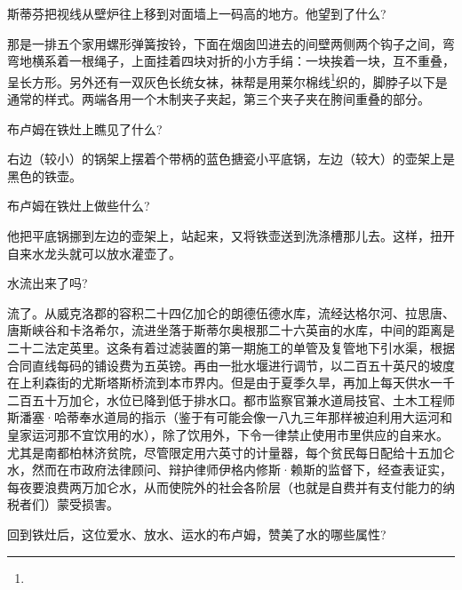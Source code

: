 \par 斯蒂芬把视线从壁炉往上移到对面墙上一码高的地方。他望到了什么?
\par 那是一排五个家用螺形弹簧按铃，下面在烟囱凹进去的间壁两侧两个钩子之间，弯弯地横系着一根绳子，上面挂着四块对折的小方手绢：一块挨着一块，互不重叠，呈长方形。另外还有一双灰色长统女袜，袜帮是用莱尔棉线\footnote{}织的，脚脖子以下是通常的样式。两端各用一个木制夹子夹起，第三个夹子夹在胯间重叠的部分。
\par 布卢姆在铁灶上瞧见了什么?
\par 右边（较小）的锅架上摆着个带柄的蓝色搪瓷小平底锅，左边（较大）的壶架上是黑色的铁壶。
\par 布卢姆在铁灶上做些什么?
\par 他把平底锅挪到左边的壶架上，站起来，又将铁壶送到洗涤槽那儿去。这样，扭开自来水龙头就可以放水灌壶了。
\par 水流出来了吗?
\par 流了。从威克洛郡的容积二十四亿加仑的朗德伍德水库，流经达格尔河、拉思唐、唐斯峡谷和卡洛希尔，流进坐落于斯蒂尔奥根那二十六英亩的水库，中间的距离是二十二法定英里。这条有着过滤装置的第一期施工的单管及复管地下引水渠，根据合同直线每码的铺设费为五英镑。再由一批水堰进行调节，以二百五十英尺的坡度在上利森街的尤斯塔斯桥流到本市界内。但是由于夏季久旱，再加上每天供水一千二百五十万加仑，水位已降到低于排水口。都市监察官兼水道局技官、土木工程师斯潘塞·哈蒂奉水道局的指示（鉴于有可能会像一八九三年那样被迫利用大运河和皇家运河那不宜饮用的水），除了饮用外，下令一律禁止使用市里供应的自来水。尤其是南都柏林济贫院，尽管限定用六英寸的计量器，每个贫民每日配给十五加仑水，然而在市政府法律顾问、辩护律师伊格内修斯·赖斯的监督下，经查表证实，每夜要浪费两万加仑水，从而使院外的社会各阶层（也就是自费并有支付能力的纳税者们）蒙受损害。
\par 回到铁灶后，这位爱水、放水、运水的布卢姆，赞美了水的哪些属性?
